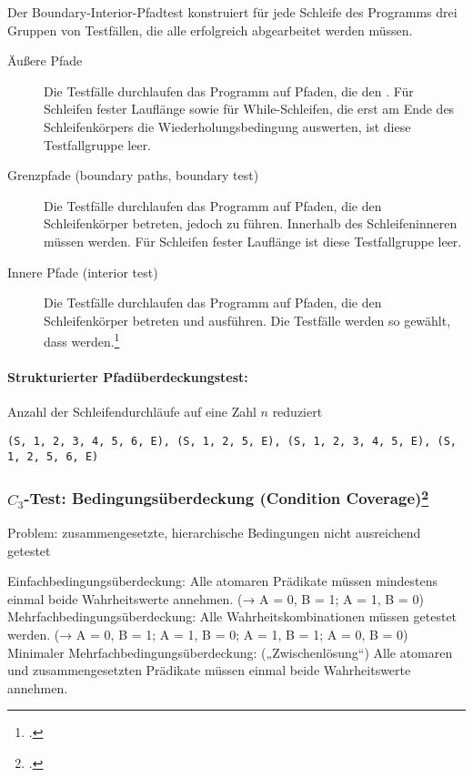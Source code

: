 \documentclass{lehramt-informatik}
\begin{document}
\noindent
Der Boundary-Interior-Pfadtest konstruiert für jede Schleife des
Programms drei Gruppen von Testfällen, die alle erfolgreich abgearbeitet
werden müssen.

\begin{description}
\item[Äußere Pfade]
Die Testfälle durchlaufen das Programm auf Pfaden, die den
. Für Schleifen fester Lauflänge
sowie für While-Schleifen, die erst am Ende des Schleifenkörpers die
Wiederholungsbedingung auswerten, ist diese Testfallgruppe leer.

\item[Grenzpfade (boundary paths, boundary test)] Die Testfälle
durchlaufen das Programm auf Pfaden, die den Schleifenkörper betreten,
jedoch zu  führen. Innerhalb des
Schleifeninneren müssen  werden.
Für Schleifen fester Lauflänge ist diese Testfallgruppe leer.

\item[Innere Pfade (interior test)] Die Testfälle durchlaufen das
Programm auf Pfaden, die den Schleifenkörper betreten und
 ausführen. Die Testfälle
werden so gewählt, dass  werden.\footcite[Seite 212]{hoffmann}
\end{description}

\paragraph{Strukturierter Pfadüberdeckungstest:}

\noindent
Anzahl der Schleifendurchläufe auf eine
Zahl $n$ reduziert


\texttt{(S, 1, 2, 3, 4, 5, 6, E), (S, 1, 2, 5, E),
(S, 1, 2, 3, 4, 5, E), (S, 1, 2, 5, 6, E)}

%

\subsubsection{$C_3$-Test: Bedingungsüberdeckung (Condition Coverage)\footcite[Seite 40]{sosy:fs:5}}

Problem: zusammengesetzte, hierarchische Bedingungen nicht ausreichend
getestet

Einfachbedingungsüberdeckung:
Alle atomaren Prädikate müssen mindestens einmal beide Wahrheitswerte
annehmen.
(→ A = 0, B = 1; A = 1, B = 0)
Mehrfachbedingungsüberdeckung:
Alle Wahrheitskombinationen müssen getestet werden.
(→ A = 0, B = 1; A = 1, B = 0; A = 1, B = 1; A = 0, B = 0)
Minimaler Mehrfachbedingungsüberdeckung: („Zwischenlösung“)
Alle atomaren und zusammengesetzten Prädikate müssen einmal beide
Wahrheitswerte annehmen.
\end{document}
